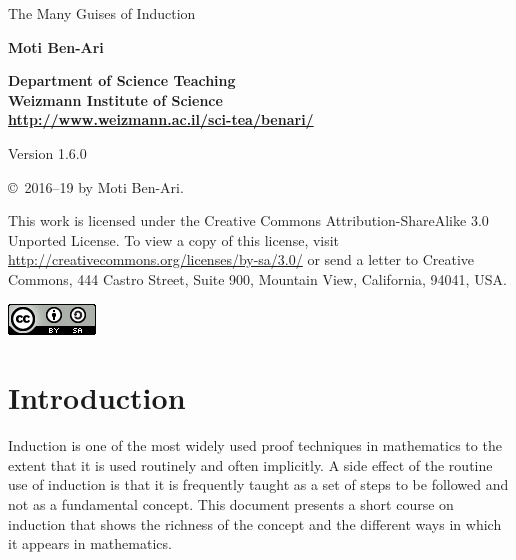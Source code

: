 \documentclass[11pt,a4paper]{report}
\begin{document}
\thispagestyle{empty}

\begin{center}
\begin{Huge}
\begin{bfseries}
The Many Guises of Induction
\end{bfseries}
\end{Huge}

\bigskip
\bigskip
\bigskip

\textbf{\LARGE Moti Ben-Ari}

\bigskip

\textbf{\Large Department of Science Teaching\\
Weizmann Institute of Science\\
\bigskip
\url{http://www.weizmann.ac.il/sci-tea/benari/}
}

\bigskip
\bigskip


\begin{Large}
Version 1.6.0
\end{Large}
\end{center}

\vfill

\begin{center}
\copyright{}\  2016--19 by Moti Ben-Ari.
\end{center}

This work is licensed under the Creative Commons Attribution-ShareAlike 3.0 Unported License. To view a copy of this license, visit \url{http://creativecommons.org/licenses/by-sa/3.0/} or send a letter to Creative Commons, 444 Castro Street, Suite 900, Mountain View, California, 94041, USA.

\begin{center}
\includegraphics[width=.2\textwidth]{../../by-sa.png}
\end{center}

\newpage

\setcounter{tocdepth}{0}
\tableofcontents

\chapter{Introduction}\label{s.intro}

Induction is one of the most widely used proof techniques in mathematics to the extent that it is used routinely and often implicitly. A side effect of the routine use of induction is that it is frequently taught as a set of steps to be followed and not as a fundamental concept. This document presents a short course on induction that shows the richness of the concept and the different ways in which it appears in mathematics.
\end{document}
